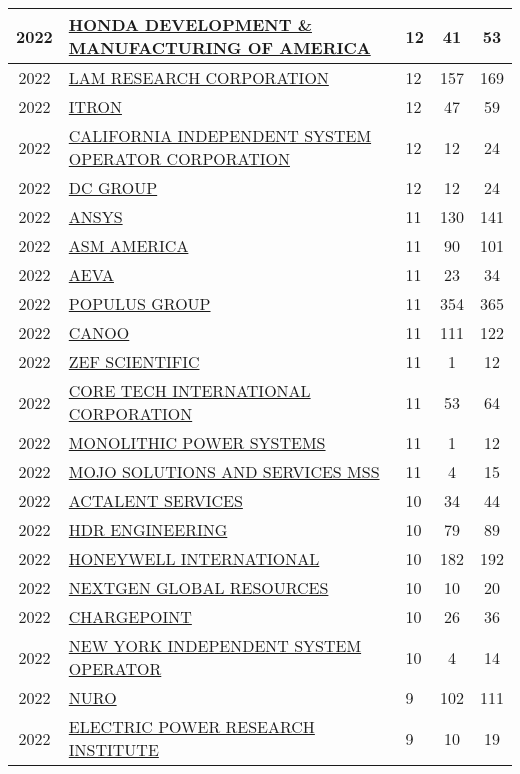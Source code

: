 \documentclass{article}%
\begin{document}
\begin{longtable}{c|p{20em}|p{5em}|c|c}
\hline%
2022&\hyperref[subsec:HONDADEVELOPMENTMANUFACTURINGOFAMERICA]{HONDA DEVELOPMENT \& MANUFACTURING OF AMERICA}&12&41&53\\%
\hline%
2022&\hyperref[subsec:LAMRESEARCHCORPORATION]{LAM RESEARCH CORPORATION}&12&157&169\\%
\hline%
2022&\hyperref[subsec:ITRON]{ITRON}&12&47&59\\%
\hline%
2022&\hyperref[subsec:CALIFORNIAINDEPENDENTSYSTEMOPERATORCORPORATION]{CALIFORNIA INDEPENDENT SYSTEM OPERATOR CORPORATION}&12&12&24\\%
\hline%
2022&\hyperref[subsec:DCGROUP]{DC GROUP}&12&12&24\\%
\hline%
2022&\hyperref[subsec:ANSYS]{ANSYS}&11&130&141\\%
\hline%
2022&\hyperref[subsec:ASMAMERICA]{ASM AMERICA}&11&90&101\\%
\hline%
2022&\hyperref[subsec:AEVA]{AEVA}&11&23&34\\%
\hline%
2022&\hyperref[subsec:POPULUSGROUP]{POPULUS GROUP}&11&354&365\\%
\hline%
2022&\hyperref[subsec:CANOO]{CANOO}&11&111&122\\%
\hline%
2022&\hyperref[subsec:ZEFSCIENTIFIC]{ZEF SCIENTIFIC}&11&1&12\\%
\hline%
2022&\hyperref[subsec:CORETECHINTERNATIONALCORPORATION]{CORE TECH INTERNATIONAL CORPORATION}&11&53&64\\%
\hline%
2022&\hyperref[subsec:MONOLITHICPOWERSYSTEMS]{MONOLITHIC POWER SYSTEMS}&11&1&12\\%
\hline%
2022&\hyperref[subsec:MOJOSOLUTIONSANDSERVICESMSS]{MOJO SOLUTIONS AND SERVICES MSS}&11&4&15\\%
\hline%
2022&\hyperref[subsec:ACTALENTSERVICES]{ACTALENT SERVICES}&10&34&44\\%
\hline%
2022&\hyperref[subsec:HDRENGINEERING]{HDR ENGINEERING}&10&79&89\\%
\hline%
2022&\hyperref[subsec:HONEYWELLINTERNATIONAL]{HONEYWELL INTERNATIONAL}&10&182&192\\%
\hline%
2022&\hyperref[subsec:NEXTGENGLOBALRESOURCES]{NEXTGEN GLOBAL RESOURCES}&10&10&20\\%
\hline%
2022&\hyperref[subsec:CHARGEPOINT]{CHARGEPOINT}&10&26&36\\%
\hline%
2022&\hyperref[subsec:NEWYORKINDEPENDENTSYSTEMOPERATOR]{NEW YORK INDEPENDENT SYSTEM OPERATOR}&10&4&14\\%
\hline%
2022&\hyperref[subsec:NURO]{NURO}&9&102&111\\%
\hline%
2022&\hyperref[subsec:ELECTRICPOWERRESEARCHINSTITUTE]{ELECTRIC POWER RESEARCH INSTITUTE}&9&10&19\\%

\end{longtable}
\end{document}
